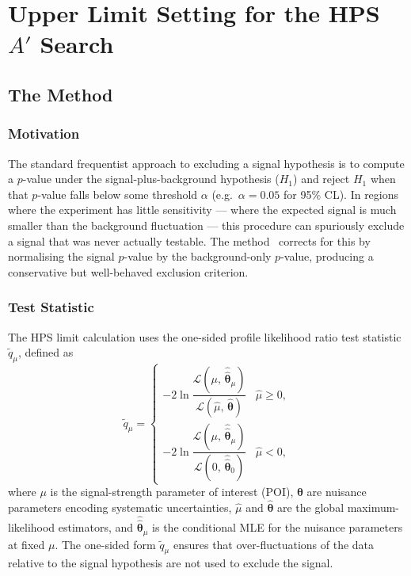 \section{Upper Limit Setting for the HPS \texorpdfstring{$A'$}{A'} Search}

\subsection{The \CLs{} Method}

\subsubsection{Motivation}

The standard frequentist approach to excluding a signal hypothesis is to
compute a $p$-value under the signal-plus-background hypothesis ($H_1$) and
reject $H_1$ when that $p$-value falls below some threshold $\alpha$ (e.g.\
$\alpha = 0.05$ for 95\% CL).  In regions where the experiment has little
sensitivity — where the expected signal is much smaller than the background
fluctuation — this procedure can spuriously exclude a signal that was never
actually testable.  The \CLs{} method~\cite{Read2002,Junk1999} corrects for
this by normalising the signal $p$-value by the background-only $p$-value,
producing a conservative but well-behaved exclusion criterion.

\subsubsection{Test Statistic}

The HPS limit calculation uses the one-sided profile likelihood ratio test
statistic $\tilde{q}_\mu$, defined as
%
\begin{equation}
  \tilde{q}_\mu =
  \begin{cases}
    -2\ln\dfrac{\mathcal{L}(\mu,\,\hat{\hat{\boldsymbol{\theta}}}_\mu)}
               {\mathcal{L}(\hat{\mu},\,\hat{\boldsymbol{\theta}})}
    & \hat{\mu} \geq 0, \\[10pt]
    -2\ln\dfrac{\mathcal{L}(\mu,\,\hat{\hat{\boldsymbol{\theta}}}_\mu)}
               {\mathcal{L}(0,\,\hat{\hat{\boldsymbol{\theta}}}_0)}
    & \hat{\mu} < 0,
  \end{cases}
\end{equation}
%
where $\mu$ is the signal-strength parameter of interest (POI),
$\boldsymbol{\theta}$ are nuisance parameters encoding systematic
uncertainties, $\hat{\mu}$ and $\hat{\boldsymbol{\theta}}$ are the global
maximum-likelihood estimators, and $\hat{\hat{\boldsymbol{\theta}}}_\mu$ is
the conditional MLE for the nuisance parameters at fixed $\mu$.  The
one-sided form $\tilde{q}_\mu$ ensures that over-fluctuations of the data
relative to the signal hypothesis are not used to exclude the signal.


